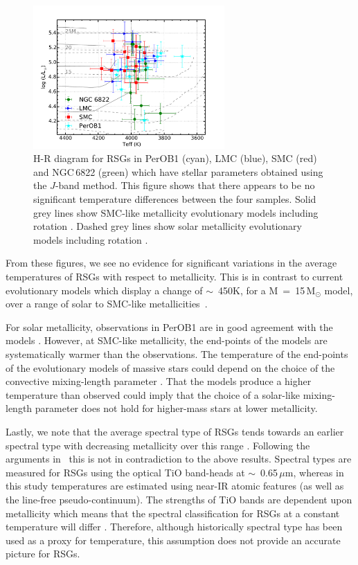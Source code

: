 \begin{figure}
 \centering
\includegraphics[width=0.65\textwidth]{ngc6822/N6822_HRD_all_thesis}
\caption[H-R diagram from four different environments]{
H-R diagram for RSGs in PerOB1 (cyan), LMC (blue), SMC (red) and NGC\,6822 (green) which have stellar parameters obtained using the $J$-band method.
This figure shows that there appears to be no significant temperature differences between the four samples.
Solid grey lines show SMC-like metallicity evolutionary models including rotation
\protect\citep{2013A&A...558A.103G}.
Dashed grey lines show solar metallicity evolutionary models including rotation
\protect\citep{2012A&A...537A.146E}.\label{fig:HRD}
        }
\end{figure}


From these figures, we see no evidence for significant variations in the average temperatures of RSGs with respect to metallicity.
This is in contrast to current evolutionary models which display a change of $\sim$~450K,
for a M~=~15\,M$_{\odot}$ model,
over a range of solar to SMC-like metallicities~\citep{2012A&A...537A.146E,2013A&A...558A.103G}.

For solar metallicity, observations in PerOB1 are in good agreement with the models
\citep[see Figure 9 in][]{2014ApJ...788...58G}.
However, at SMC-like metallicity, the end-points of the models are systematically warmer than the observations.
The temperature of the end-points of the evolutionary models of massive stars could depend on the choice of the convective mixing-length parameter
\citep{1992A&AS...96..269S}.
That the models produce a higher temperature than observed could imply that the choice of a solar-like mixing-length parameter does not hold for higher-mass stars at lower metallicity.

Lastly, we note that the average spectral type of RSGs tends towards an earlier spectral type with decreasing metallicity over this range
\citep{1979ApJ...231..384H,2012AJ....144....2L}.
Following the arguments in~\citet{1979ApJ...231..384H} this is not in contradiction to the above results.
Spectral types are measured for RSGs using the optical TiO band-heads at
$\sim$~0.65\,$\mu$m,
whereas in this study temperatures are estimated using near-IR atomic features
(as well as the line-free pseudo-continuum).
The strengths of TiO bands are dependent upon metallicity which means that
the spectral classification for RSGs at a constant temperature will differ
\citep{2013ApJ...767....3D}.
Therefore, although historically spectral type has been used as a proxy for temperature, this assumption does not provide an accurate picture for RSGs.

